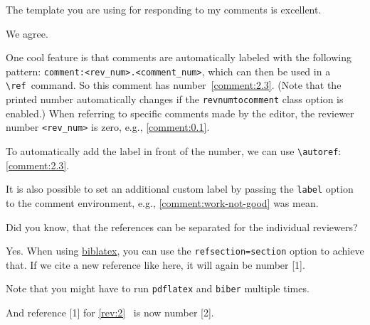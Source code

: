 \documentclass[12pt,english,DIV=13,revnumtocomment,revnumtoheader]{reviewresponse}
\begin{document}
\begin{revcomment}
	The template you are using for responding to my comments is excellent.
\end{revcomment}
\begin{revresponse}
	We agree.

	One cool feature is that comments are automatically labeled with the following pattern: \verb|comment:<rev_num>.<comment_num>|, which can then be used in a \verb|\ref|~command.
	So this comment has number~\ref{comment:2.3}.
	(Note that the printed number automatically changes if the \texttt{revnumtocomment} class option is enabled.)
	When referring to specific comments made by the editor, the reviewer number \verb|<rev_num>| is zero, e.g., \autoref{comment:0.1}.

	To automatically add the label in front of the number, we can use \verb|\autoref|: \autoref{comment:2.3}.

	It is also possible to set an additional custom label by passing the \texttt{label} option to the comment environment, e.g., \autoref{comment:work-not-good} was mean.
\end{revresponse}


\reviewer
\begin{revcomment}
	Did you know, that the references can be separated for the individual reviewers?
\end{revcomment}
\begin{revresponse}
	Yes. When using \href{https://www.ctan.org/pkg/biblatex}{biblatex}, you can use the \texttt{refsection=section} option to achieve that.
	If we cite a new reference like \cite{Besser2021} here, it will again be number [1].

	Note that you might have to run \texttt{pdflatex} and \texttt{biber} multiple times.

	And reference [1] for \autoref{rev:2}~\cite{ReviewerReference} is now number [2].

\end{revresponse}
\end{document}
